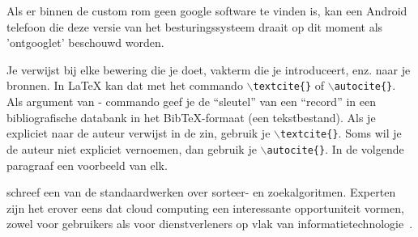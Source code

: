 Als er binnen de custom rom geen google software te vinden is, kan een Android telefoon die deze versie van het besturingssysteem draait op dit moment als 'ontgooglet' beschouwd worden. 

Je verwijst bij elke bewering die je doet, vakterm die je introduceert, enz. naar je bronnen. In \LaTeX{} kan dat met het commando \texttt{$\backslash${textcite\{\}}} of \texttt{$\backslash${autocite\{\}}}. Als argument van - commando geef je de ``sleutel'' van een ``record'' in een bibliografische databank in het Bib\TeX{}-formaat (een tekstbestand). Als je expliciet naar de auteur verwijst in de zin, gebruik je \texttt{$\backslash${}textcite\{\}}.
Soms wil je de auteur niet expliciet vernoemen, dan gebruik je \texttt{$\backslash${}autocite\{\}}. In de volgende paragraaf een voorbeeld van elk.

\textcite{Knuth1998} schreef een van de standaardwerken over sorteer- en zoekalgoritmen. Experten zijn het erover eens dat cloud computing een interessante opportuniteit vormen, zowel voor gebruikers als voor dienstverleners op vlak van informatietechnologie~\autocite{Creeger2009}.
